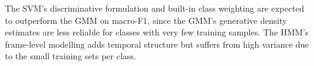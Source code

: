 \documentclass[conference]{IEEEtran}
\begin{document}
The SVM's discriminative formulation and built-in class weighting are
expected to outperform the GMM on macro-F1, since the GMM's generative
density estimates are less reliable for classes with very few training
samples.  The HMM's frame-level modelling adds temporal structure but
suffers from high variance due to the small training sets per class.







\end{document}
